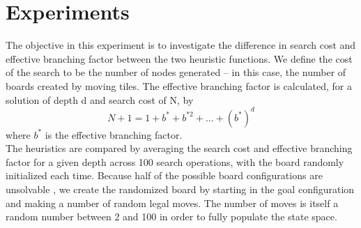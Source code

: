 
\section{Experiments}
\label{sec:expts}

The objective in this experiment is to investigate the difference in search cost and effective branching factor between the two heuristic functions.  We define the cost of the search to be the number of nodes generated -- in this case, the number of boards created by moving tiles.  The effective branching factor is calculated, for a solution of depth d and search cost of N, by 
$$ N + 1 = 1 + b^* + b^{*2} + ... + (b^*)^d $$
where $b^*$ is the effective branching factor.\\

The heuristics are compared by averaging the search cost and effective branching factor for a given depth across 100 search operations, with the board randomly initialized each time.  Because half of the possible board configurations are unsolvable \cite{15notes}, we create the randomized board by starting in the goal configuration and making a number of random legal moves.  The number of moves is itself a random number between 2 and 100 in order to fully populate the state space.


